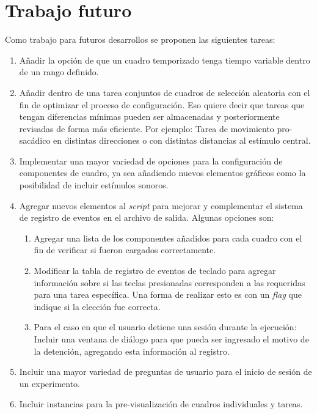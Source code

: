 \documentclass[\main/Main.tex]{subfiles}
\begin{document}
	\section{Trabajo futuro}
	\label{sec:05_trabajo_futuro}
		Como trabajo para futuros desarrollos se proponen las siguientes tareas:
		\begin{enumerate}\setlength\itemsep{-0.2em}
			\item Añadir la opción de que un cuadro temporizado tenga tiempo variable dentro de un rango definido.
			\item Añadir dentro de una tarea conjuntos de cuadros de selección aleatoria con el fin de optimizar el proceso de configuración. Eso quiere decir que tareas que tengan diferencias mínimas pueden ser almacenadas y posteriormente revisadas de forma más eficiente. Por ejemplo: Tarea de movimiento pro-sacádico en distintas direcciones o con distintas distancias al estímulo central.  
			\item Implementar una mayor variedad de opciones para la configuración de componentes de cuadro, ya sea añadiendo nuevos elementos gráficos como la posibilidad de incluir estímulos sonoros.  
			\item Agregar nuevos elementos al \textit{script} para mejorar y complementar el sistema de registro de eventos en el archivo de salida. Algunas opciones son:
				\begin{enumerate}\setlength\itemsep{-0.2em}
					\item Agregar una lista de los componentes añadidos para cada cuadro con el fin de verificar si fueron cargados correctamente.
					\item Modificar la tabla de registro de eventos de teclado para agregar información sobre si las teclas presionadas corresponden a las requeridas para una tarea específica. Una forma de realizar esto es con un \textit{flag} que indique si la elección fue correcta. 
					\item Para el caso en que el usuario detiene una sesión durante la ejecución: Incluir una ventana de diálogo para que pueda ser ingresado el motivo de la detención, agregando esta información al registro. 

				\end{enumerate}
			\item Incluir una mayor variedad de preguntas de usuario para el inicio de sesión de un experimento. 
			\item Incluir instancias para la pre-visualización de cuadros individuales y tareas.

		\end{enumerate}
	
\end{document}
